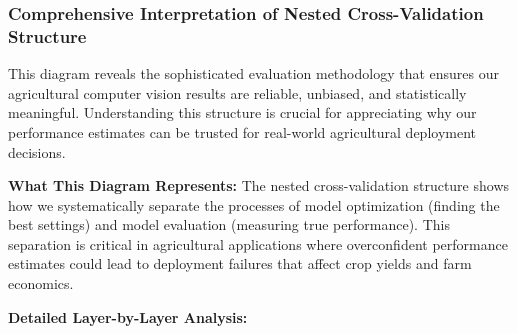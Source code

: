 \subsubsection{Comprehensive Interpretation of Nested Cross-Validation Structure}

This diagram reveals the sophisticated evaluation methodology that ensures our agricultural computer vision results are reliable, unbiased, and statistically meaningful. Understanding this structure is crucial for appreciating why our performance estimates can be trusted for real-world agricultural deployment decisions.

\textbf{What This Diagram Represents:} The nested cross-validation structure shows how we systematically separate the processes of model optimization (finding the best settings) and model evaluation (measuring true performance). This separation is critical in agricultural applications where overconfident performance estimates could lead to deployment failures that affect crop yields and farm economics.

\textbf{Detailed Layer-by-Layer Analysis:}

